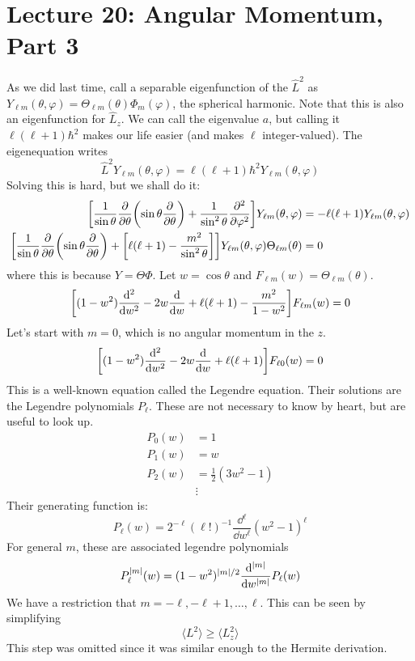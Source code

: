 \section{Lecture 20: Angular Momentum, Part 3} 

As we did last time, call a separable eigenfunction of the $\hat{L}^2$ as $Y_{\ell m}(\theta, \varphi) = \Theta_{\ell m}(\theta) \Phi_m(\varphi)$, the spherical harmonic. Note that this is
also an eigenfunction for $\hat{L}_z$. We can call the eigenvalue $a$, but calling it $\ell(\ell + 1)\hbar^2$ makes our life easier (and makes $\ell$ integer-valued).
The eigenequation writes
\[ \hat{L}^2 Y_{\ell m}(\theta, \varphi) = \ell(\ell + 1) \hbar^2 Y_{\ell m}(\theta, \varphi) \]
Solving this is hard, but we shall do it:
\begin{align*}
    \qty[\frac{1}{\sin \theta} \pdv{}{\theta} \qty(\sin \theta \pdv{}{\theta}) + \frac{1}{\sin^2 \theta} \pdv{^2}{\varphi^2}] Y_{\ell m}(\theta, \varphi) &= - \ell(\ell + 1) Y_{\ell m}(\theta, \varphi) \\
    \qty[\frac{1}{\sin \theta} \pdv{}{\theta} \qty(\sin \theta \pdv{}{\theta}) + \qty[\ell(\ell + 1) - \frac{m^2}{\sin^2 \theta}]] Y_{\ell m}(\theta, \varphi) \Theta_{\ell m}(\theta) &= 0
\end{align*}
where this is because $Y = \Theta \Phi$. Let $w = \cos \theta$ and $F_{\ell m}(w) = \Theta_{\ell m}(\theta)$.
\[ \qty[(1 - w^2) \dv{^2}{w^2} - 2w \dv{}{w} + \ell(\ell + 1) - \frac{m^2}{1 - w^2}] F_{\ell m}(w) = 0 \]
Let's start with $m = 0$, which is no angular momentum in the $z$.
\[ \qty[(1 - w^2) \dv{^2}{w^2} - 2w \dv{}{w} + \ell(\ell + 1)] F_{\ell 0}(w) = 0 \]
This is a well-known equation called the Legendre equation. Their solutions are the Legendre polynomials $P_{\ell}$. These are not
necessary to know by heart, but are useful to look up.
\begin{align*}
    P_0(w) &= 1 \\
    P_1(w) &= w \\
    P_2(w) &= \frac{1}{2}(3w^2 - 1) \\
    &\vdots
\end{align*}
Their generating function is:
\[ P_{\ell}(w) = 2^{-\ell} (\ell!)^{-1} \frac{\dd{^{\ell}}}{\dd{w^{\ell}}} (w^2 - 1)^{\ell} \]
For general $m$, these are associated legendre polynomials 
\[ P_{\ell}^{|m|}(w) = (1 - w^2)^{|m|/2} \dv{^{|m|}}{w^{|m|}} P_{\ell}(w)\]
We have a restriction that $m = - \ell, -\ell + 1, \dots, \ell$. This can be seen by simplifying
\[ \langle L^2 \rangle \geq \langle L_z^2 \rangle \]
This step was omitted since it was similar enough to the Hermite derivation.

